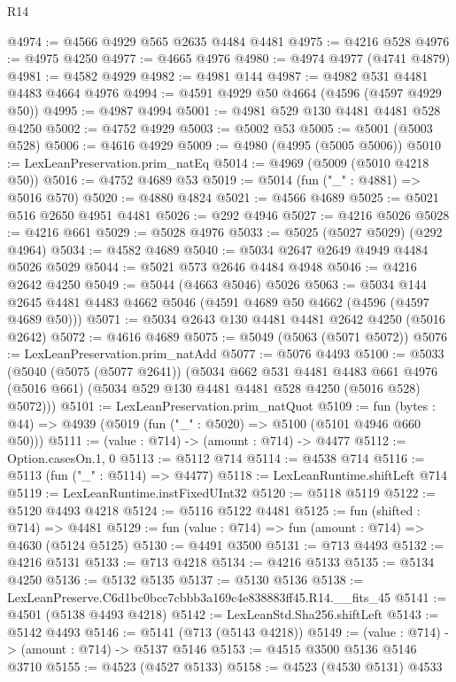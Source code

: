 \begin{lexlean}{R14}
\begin{coremodule}
@4974 := @4566 @4929 @565 @2635 @4484 @4481
@4975 := @4216 @528
@4976 := @4975 @4250
@4977 := @4665 @4976
@4980 := @4974 @4977 (@4741 @4879)
@4981 := @4582 @4929
@4982 := @4981 @144
@4987 := @4982 @531 @4481 @4483 @4664 @4976
@4994 := @4591 @4929 @50 @4664 (@4596 (@4597 @4929 @50))
@4995 := @4987 @4994
@5001 := @4981 @529 @130 @4481 @4481 @528 @4250
@5002 := @4752 @4929
@5003 := @5002 @53
@5005 := @5001 (@5003 @528)
@5006 := @4616 @4929
@5009 := @4980 (@4995 (@5005 @5006))
@5010 := LexLeanPreservation.prim_natEq
@5014 := @4969 (@5009 (@5010 @4218 @50))
@5016 := @4752 @4689 @53
@5019 := @5014 (fun ("_" : @4881) => @5016 @570)
@5020 := @4880 @4824
@5021 := @4566 @4689
@5025 := @5021 @516 @2650 @4951 @4481
@5026 := @292 @4946
@5027 := @4216 @5026
@5028 := @4216 @661
@5029 := @5028 @4976
@5033 := @5025 (@5027 @5029) (@292 @4964)
@5034 := @4582 @4689
@5040 := @5034 @2647 @2649 @4949 @4484 @5026 @5029
@5044 := @5021 @573 @2646 @4484 @4948
@5046 := @4216 @2642 @4250
@5049 := @5044 (@4663 @5046) @5026
@5063 := @5034 @144 @2645 @4481 @4483 @4662 @5046 (@4591 @4689 @50 @4662 (@4596 (@4597 @4689 @50)))
@5071 := @5034 @2643 @130 @4481 @4481 @2642 @4250 (@5016 @2642)
@5072 := @4616 @4689
@5075 := @5049 (@5063 (@5071 @5072))
@5076 := LexLeanPreservation.prim_natAdd
@5077 := @5076 @4493
@5100 := @5033
    (@5040
      (@5075 (@5077 @2641))
      (@5034
        @662
        @531
        @4481
        @4483
        @661
        @4976
        (@5016 @661)
        (@5034 @529 @130 @4481 @4481 @528 @4250 (@5016 @528) @5072)))
@5101 := LexLeanPreservation.prim_natQuot
@5109 := fun (bytes : @44) => @4939 (@5019 (fun ("_" : @5020) => @5100 (@5101 @4946 @660 @50)))
@5111 := (value : @714) -> (amount : @714) -> @4477
@5112 := Option.casesOn.{1, 0}
@5113 := @5112 @714
@5114 := @4538 @714
@5116 := @5113 (fun ("_" : @5114) => @4477)
@5118 := LexLeanRuntime.shiftLeft @714
@5119 := LexLeanRuntime.instFixedUInt32
@5120 := @5118 @5119
@5122 := @5120 @4493 @4218
@5124 := @5116 @5122 @4481
@5125 := fun (shifted : @714) => @4481
@5129 := fun (value : @714) => fun (amount : @714) => @4630 (@5124 @5125)
@5130 := @4491 @3500
@5131 := @713 @4493
@5132 := @4216 @5131
@5133 := @713 @4218
@5134 := @4216 @5133
@5135 := @5134 @4250
@5136 := @5132 @5135
@5137 := @5130 @5136
@5138 := LexLeanPreserve.C6d1bc0bcc7cbbb3a169c4e838883ff45.R14.__fits_45
@5141 := @4501 (@5138 @4493 @4218)
@5142 := LexLeanStd.Sha256.shiftLeft
@5143 := @5142 @4493
@5146 := @5141 (@713 (@5143 @4218))
@5149 := (value : @714) -> (amount : @714) -> @5137 @5146
@5153 := @4515 @3500 @5136 @5146 @3710
@5155 := @4523 (@4527 @5133)
@5158 := @4523 (@4530 @5131) @4533

\end{coremodule}
\end{lexlean}
